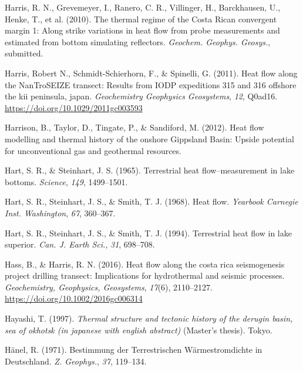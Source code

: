 \documentclass[draft,linenumbers]{agujournal2018}
\begin{document}
\leavevmode{}%
Harris, R. N., Grevemeyer, I., Ranero, C. R., Villinger, H.,
Barckhausen, U., Henke, T., et al. (2010). The thermal regime of the
{Costa Rican} convergent margin 1: Along strike variations in heat flow
from probe measurements and estimated from bottom simulating reflectors.
\emph{Geochem. Geophys. Geosys.}, submitted.

\leavevmode{}%
Harris, Robert N., Schmidt-Schierhorn, F., \& Spinelli, G. (2011). Heat
flow along the NanTroSEIZE transect: Results from IODP expeditions 315
and 316 offshore the kii peninsula, japan. \emph{Geochemistry Geophysics
Geosystems}, \emph{12}, Q0ad16.
\url{https://doi.org/10.1029/2011gc003593}

\leavevmode{}%
Harrison, B., Taylor, D., Tingate, P., \& Sandiford, M. (2012). Heat
flow modelling and thermal history of the onshore {Gippsland Basin}:
Upside potential for unconventional gas and geothermal resources.

\leavevmode{}%
Hart, S. R., \& Steinhart, J. S. (1965). Terrestrial heat
flow--measurement in lake bottoms. \emph{Science}, \emph{149},
1499--1501.

\leavevmode{}%
Hart, S. R., Steinhart, J. S., \& Smith, T. J. (1968). Heat flow.
\emph{Yearbook Carnegie Inst. Washington}, \emph{67}, 360--367.

\leavevmode{}%
Hart, S. R., Steinhart, J. S., \& Smith, T. J. (1994). Terrestrial heat
flow in lake superior. \emph{Can. J. Earth Sci.}, \emph{31}, 698--708.

\leavevmode{}%
Hass, B., \& Harris, R. N. (2016). Heat flow along the costa rica
seismogenesis project drilling transect: Implications for hydrothermal
and seismic processes. \emph{Geochemistry, Geophysics, Geosystems},
\emph{17}(6), 2110--2127. \url{https://doi.org/10.1002/2016gc006314}

\leavevmode{}%
Hayashi, T. (1997). \emph{Thermal structure and tectonic history of the
derugin basin, sea of okhotsk (in japanese with english abstract)}
(Master's thesis). Tokyo.

\leavevmode{}%
Hänel, R. (1971). Bestimmung der {Terrestrischen W{ä}rmestromdichte in
Deutschland}. \emph{Z. Geophys.}, \emph{37}, 119--134.
\end{document}
